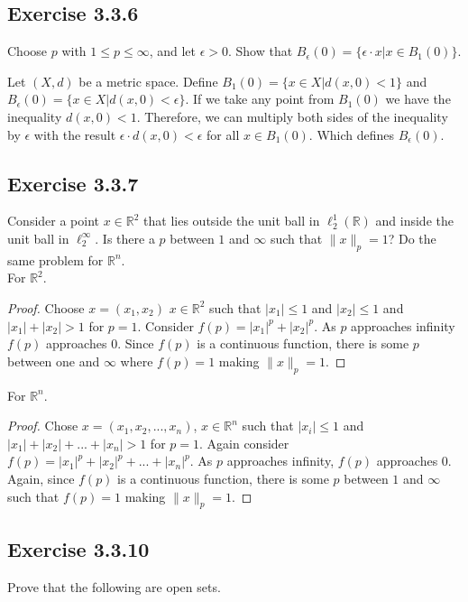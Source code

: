 \documentclass{tufte-book}
\theoremstyle{mytheoremstyle}
\theoremstyle{mylemstyle}
\theoremstyle{mydefstyle}
\begin{document}
\subsection{Exercise 3.3.6}
Choose $p$ with $1 \leq p \leq \infty$, and let $\epsilon >0$.  Show that $B_\epsilon(0) = \{\epsilon \cdot x | x \in B_1(0)\}$. 

Let $(X,d)$ be a metric space.  Define $B_1(0)=\{x \in X | d(x, 0) < 1 \}$ and $B_\epsilon(0)=\{x \in X | d(x, 0) < \epsilon \}$.  If we take any point from $B_1(0)$ we have the inequality $d(x,0) < 1$.  Therefore, we can multiply both sides of the inequality by $\epsilon$ with the result $\epsilon \cdot d(x, 0) < \epsilon$ for all $x \in B_1(0)$.  Which defines $B_\epsilon(0)$.

\subsection{Exercise 3.3.7}
Consider a point $x \in \mathbb{R}^2$ that lies outside the unit ball in $\ell_2^1(\mathbb{R})$ and inside the unit ball in $\ell_2^\infty$.  Is there a $p$ between $1$ and $\infty$ such that $\|x\|_p=1$?  Do the same problem for $\mathbb{R}^n$.\\
For $\mathbb{R}^2$.
\begin{proof}
Choose $x = (x_1, x_2)$ $x \in \mathbb{R}^2$ such that $|x_1| \leq 1$ and $|x_2| \leq 1$ and $|x_1| + |x_2| > 1$ for $p=1$. Consider $f(p) = |x_1|^p + |x_2|^p$.  As $p$ approaches infinity $f(p)$  approaches $0$. Since $f(p)$ is a continuous function, there is some $p$ between one and $\infty$ where $f(p) = 1$ making $\|x\|_p = 1$.
\end{proof}
For $\mathbb{R}^n$.
\begin{proof}
Chose $x = (x_1, x_2,...,x_n)$, $x \in \mathbb{R}^n$ such that $|x_i| \leq 1$ and $|x_1| + |x_2| +...+|x_n| > 1$ for $p=1$.  Again consider $f(p) = |x_1|^p + |x_2|^p +...+|x_n|^p$.  As $p$ approaches infinity, $f(p)$ approaches $0$.  Again, since $f(p)$ is a continuous function, there is some $p$ between $1$ and $\infty$ such that $f(p) = 1$ making $\|x\|_p = 1$.
\end{proof}

\subsection{Exercise 3.3.10}
Prove that the following are open sets.
\end{document}
